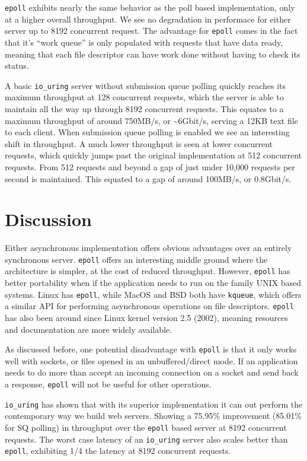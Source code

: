 \documentclass[letterpaper, 10pt, twocolumn]{article}
\begin{document}
\texttt{epoll} exhibits nearly the same behavior as the poll based implementation, only at a higher overall throughput. We see no degradation in performace for either server up to 8192 concurrent request. The advantage for \texttt{epoll} comes in the fact that it's ``work queue'' is only populated with requests that have data ready, meaning that each file descriptor can have work done without having to check its status.

A basic \texttt{io\_uring} server without submission queue polling quickly reaches its maximum throughput at 128 concurrent requests, which the server is able to maintain all the way up through 8192 concurrent requests. This equates to a maximum throughput of around 750MB/s, or \textasciitilde{}6Gbit/s, serving a 12KB text file to each client. When submission queue polling is enabled we see an interesting shift in throughput. A much lower throughput is seen at lower concurrent requests, which quickly jumps past the original implementation at 512 concurrent requests. From 512 requests and beyond a gap of just under 10,000 requests per second is maintained. This equated to a gap of around 100MB/s, or 0.8Gbit/s.

\section{Discussion}
\label{sec:org1a81b4b}
Either asynchronous implementation offers obvious advantages over an entirely synchronous server. \texttt{epoll} offers an interesting middle ground where the architecture is simpler, at the cost of reduced throughput. However, \texttt{epoll} has better portability when if the application needs to run on the family UNIX based systems. Linux has \texttt{epoll}, while MacOS and BSD both have \texttt{kqueue}, which offers a similar API for performing asynchronous operations on file descriptors. \texttt{epoll} has also been around since Linux kernel version 2.5 (2002), meaning resources and documentation are more widely available.

As discussed before, one potential disadvantage with \texttt{epoll} is that it only works well with sockets, or files opened in an unbuffered/direct mode. If an application needs to do more than accept an incoming connection on a socket and send back a response, \texttt{epoll} will not be useful for other operations.

\texttt{io\_uring} has shown that with its superior implementation it can out perform the contemporary way we build web servers. Showing a 75.95\% improvement (85.01\% for SQ polling) in throughput over the \texttt{epoll} based server at 8192 concurrent requests. The worst case latency of an \texttt{io\_uring} server also scales better than \texttt{epoll}, exhibiting 1/4 the latency at 8192 concurrent requests.
\end{document}
